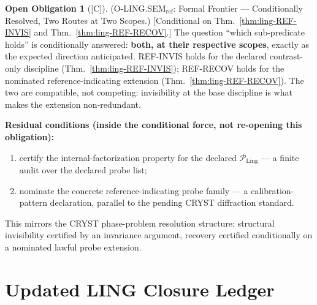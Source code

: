 \documentclass[12pt,oneside]{amsbook}
\theoremstyle{plain}
\theoremstyle{definition}
\newtheorem{obligation}[theorem]{Open Obligation}
\theoremstyle{remark}
\newcommand{\status}[1]{\textup{[#1]}}
\begin{document}
\begin{obligation}[\status{C}]\label{ob:ling-ref-formal}
\textup{(O-LING.SEM$_{\mathrm{ref}}$: Formal Frontier ---
Conditionally Resolved, Two Routes at Two Scopes.)}
\textup{[Conditional on Thm.~\ref{thm:ling-REF-INVIS} and
Thm.~\ref{thm:ling-REF-RECOV}.]}
The question ``which sub-predicate holds'' is conditionally
answered: \textbf{both, at their respective scopes}, exactly as
the expected direction anticipated.  REF-INVIS holds for the
declared contrast-only discipline
(Thm.~\ref{thm:ling-REF-INVIS}); REF-RECOV holds for the
nominated reference-indicating extension
(Thm.~\ref{thm:ling-REF-RECOV}).  The two are compatible, not
competing: invisibility at the base discipline is what makes the
extension non-redundant.

\textbf{Residual conditions (inside the conditional force, not
re-opening this obligation):}
\begin{enumerate}[label=\textup{(\alph*)}]
  \item certify the internal-factorization property for the
    declared $\mathcal{P}_{\mathrm{Ling}}$ --- a finite audit over
    the declared probe list;
  \item nominate the concrete reference-indicating probe family
    --- a calibration-pattern declaration, parallel to the pending
    CRYST diffraction standard.
\end{enumerate}
This mirrors the CRYST phase-problem resolution structure:
structural invisibility certified by an invariance argument,
recovery certified conditionally on a nominated lawful probe
extension.
\end{obligation}

\section{Updated LING Closure Ledger}\label{sec:ling-closure-updated}
\end{document}
